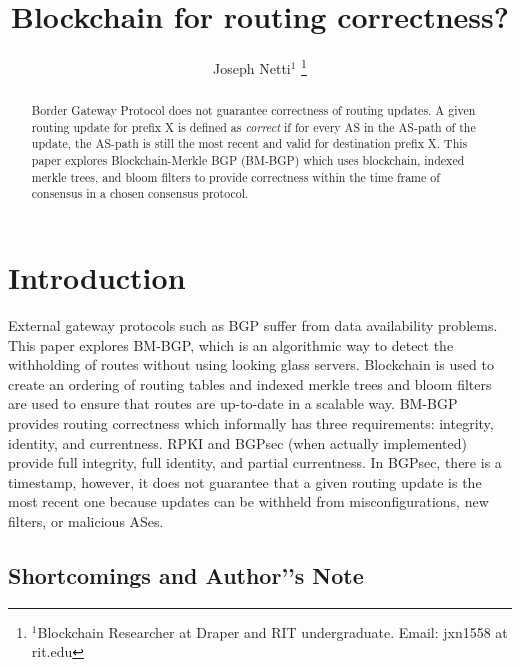 \documentclass[letterpaper, 10 pt, conference]{ieeeconf}  %
\title{\LARGE \bf
Blockchain for routing correctness?
}
\author{Joseph Netti$^{1}$%
\thanks{$^{1}$Blockchain Researcher at Draper and RIT undergraduate. Email: jxn1558 at rit.edu}%
}
\begin{document}
\maketitle
\thispagestyle{empty}
\pagestyle{empty}


\begin{abstract}
Border Gateway Protocol does not guarantee correctness of routing updates. A given routing update for prefix X is defined as \textit{correct} if for every AS in the AS-path of the update, the AS-path is still the most recent and valid for destination prefix X. This paper explores Blockchain-Merkle BGP (BM-BGP) which uses blockchain, indexed merkle trees, and bloom filters to provide correctness within the time frame of consensus in a chosen consensus protocol. 

\end{abstract}

\section{Introduction}
External gateway protocols such as BGP suffer from data availability problems. This paper explores BM-BGP, which is an algorithmic way to detect the withholding of routes without using looking glass servers. Blockchain is used to create an ordering of routing tables and indexed merkle trees and bloom filters are used to ensure that routes are up-to-date in a scalable way. BM-BGP provides routing correctness which informally has three requirements: integrity, identity, and currentness. RPKI and BGPsec (when actually implemented) provide full integrity, full identity, and partial currentness. In BGPsec, there is a timestamp, however, it does not guarantee that a given routing update is the most recent one because updates can be withheld from misconfigurations, new filters, or malicious ASes. 

\subsection{Shortcomings and Author’'s Note}
\end{document}
